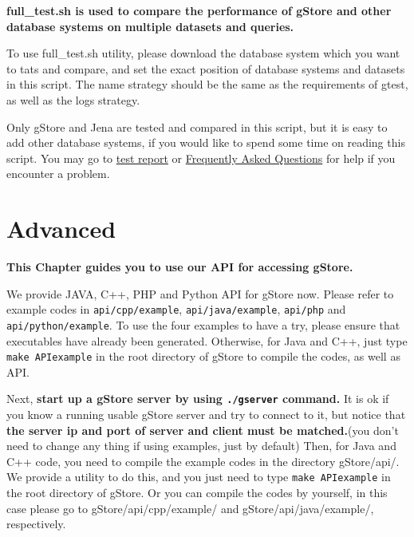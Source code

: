 \documentclass[titlepage, a4paper, 12pt]{article}
\begin{document}
\textbf{full\_test.sh is used to compare the performance of gStore and
other database systems on multiple datasets and queries.}

To use full\_test.sh utility, please download the database system which
you want to tats and compare, and set the exact position of database
systems and datasets in this script. The name strategy should be the
same as the requirements of gtest, as well as the logs strategy.

Only gStore and Jena are tested and compared in this script, but it is
easy to add other database systems, if you would like to spend some time
on reading this script. You may go to
\href{run:../pdf/gstore���Ա���.pdf}{test
report} or \hyperref[chapter10]{Frequently Asked Questions} for help if
you encounter a problem.

\clearpage

\part{Advanced}


\textbf{This Chapter guides you to use our API for accessing gStore.}


We provide JAVA, C++, PHP and Python API for gStore now. Please refer to example
codes in \texttt{api/cpp/example}, \texttt{api/java/example}, \texttt{api/php} and \texttt{api/python/example}. To use the four examples to have a try, please ensure that executables have already been generated. Otherwise, for Java and C++, just type \texttt{make\ APIexample} in the root directory of gStore to compile the codes, as well as API.

Next, \textbf{start up a gStore server by using \texttt{./gserver}
command.} It is ok if you know a running usable gStore server and try to
connect to it, but notice that \textbf{the server ip and port of server
and client must be matched.}(you don't need to change any thing if using
examples, just by default) Then, for Java and C++ code, you need to compile the example codes
in the directory gStore/api/. We provide a utility to do this, and you
just need to type \texttt{make\ APIexample} in the root directory of
gStore. Or you can compile the codes by yourself, in this case please go
to gStore/api/cpp/example/ and gStore/api/java/example/, respectively.
\end{document}

